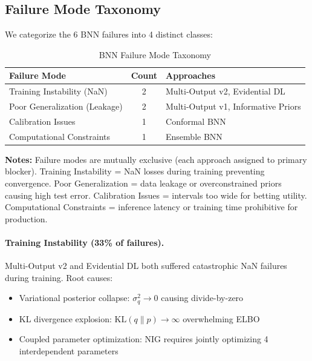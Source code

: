 \subsection{Failure Mode Taxonomy}

We categorize the 6 BNN failures into 4 distinct classes:

\begin{table}[htbp]
\centering
\caption{BNN Failure Mode Taxonomy}
\label{tab:failure-taxonomy}
\small
\begin{tabular}{@{} l S[table-format=1.0] l @{}}
\toprule
\textbf{Failure Mode} & \textbf{Count} & \textbf{Approaches} \\
\midrule
Training Instability (NaN) & 2 & Multi-Output v2, Evidential DL \\
Poor Generalization (Leakage) & 2 & Multi-Output v1, Informative Priors \\
Calibration Issues & 1 & Conformal BNN \\
Computational Constraints & 1 & Ensemble BNN \\
\bottomrule
\end{tabular}

\vspace{2mm}
\begin{minipage}{\linewidth}
\small
\textbf{Notes:} Failure modes are mutually exclusive (each approach assigned to primary blocker). Training Instability = NaN losses during training preventing convergence. Poor Generalization = data leakage or overconstrained priors causing high test error. Calibration Issues = intervals too wide for betting utility. Computational Constraints = inference latency or training time prohibitive for production.
\end{minipage}
\end{table}

\paragraph{Training Instability (33\% of failures).}
Multi-Output v2 and Evidential DL both suffered catastrophic NaN failures during training. Root causes:
\begin{itemize}[itemsep=2pt,parsep=0pt]
    \item Variational posterior collapse: $\sigma^2_q \to 0$ causing divide-by-zero
    \item KL divergence explosion: $\text{KL}(q \| p) \to \infty$ overwhelming ELBO
    \item Coupled parameter optimization: NIG requires jointly optimizing 4 interdependent parameters
\end{itemize}

